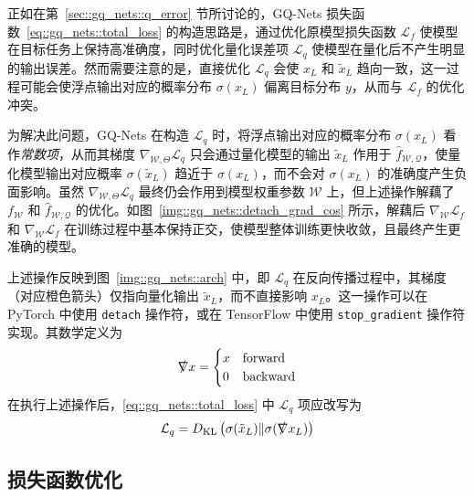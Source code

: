 \documentclass[
  fontset = mac,
]{shtthesis}
\providecommand{\KL}[2]{D_{\mathrm{KL}}\left( #1 \| #2 \right)}
\providecommand{\NoDiff}[1]{\slashed{\nabla} #1}
\begin{document}
正如在第~\ref{sec::gq_nets::q_error} 节所讨论的，GQ-Nets 损失函数~\eqref{eq::gq_nets::total_loss} 的构造思路是，通过优化原模型损失函数 $\mathcal{L}_f$ 使模型在目标任务上保持高准确度，同时优化量化误差项 $\mathcal{L}_q$ 使模型在量化后不产生明显的输出误差。然而需要注意的是，直接优化 $\mathcal{L}_q$ 会使 $x_L$ 和 $\tilde{x}_L$ 趋向一致，这一过程可能会使浮点输出对应的概率分布 $\sigma(x_L)$ 偏离目标分布 $y$，从而与 $\mathcal{L}_f$ 的优化冲突。

为解决此问题，GQ-Nets 在构造 $\mathcal{L}_q$ 时，将浮点输出对应的概率分布 $\sigma(x_L)$ 看作\emph{常数项}，从而其梯度 $\nabla_{\mathcal{W}, \Theta} \mathcal{L}_q$ 只会通过量化模型的输出 $\tilde{x}_L$ 作用于 $\hat{f}_{\mathcal{W, Q}}$，使量化模型输出对应概率 $\sigma(\tilde{x}_L)$ 趋近于 $\sigma(x_L)$，而不会对 $\sigma(x_L)$ 的准确度产生负面影响。虽然 $\nabla_{\mathcal{W}, \Theta} \mathcal{L}_q$ 最终仍会作用到模型权重参数 $\mathcal{W}$ 上，但上述操作解藕了 $f_{\mathcal{W}}$ 和 $\hat{f}_{\mathcal{W, Q}}$ 的优化。如图~\ref{img::gq_nets::detach_grad_cos} 所示，解藕后 $\nabla_{\mathcal{W}} \mathcal{L}_f$ 和 $\nabla_{\mathcal{W}} \mathcal{L}_f$ 在训练过程中基本保持正交，使模型整体训练更快收敛，且最终产生更准确的模型。

上述操作反映到图~\ref{img::gq_nets::arch} 中，即 $\mathcal{L}_q$ 在反向传播过程中，其梯度（对应橙色箭头）仅指向量化输出 $\tilde{x}_L$，而不直接影响 $x_L$。这一操作可以在 PyTorch 中使用 \verb|detach| 操作符，或在 TensorFlow 中使用 \verb|stop_gradient| 操作符实现。其数学定义为
\begin{align}
  \NoDiff{x} =
    \begin{cases}
      x & \text{forward} \\
      0 & \text{backward}
    \end{cases}
\end{align}
在执行上述操作后，\eqref{eq::gq_nets::total_loss} 中 $\mathcal{L}_q$ 项应改写为
\begin{align}
  \mathcal{L}_q = \KL{\sigma(\tilde{x}_L)}{\sigma(\NoDiff{x_L})}
\end{align}
\subsection{损失函数优化} \label{sec::gq_nets::optimize_loss_func}
\end{document}

